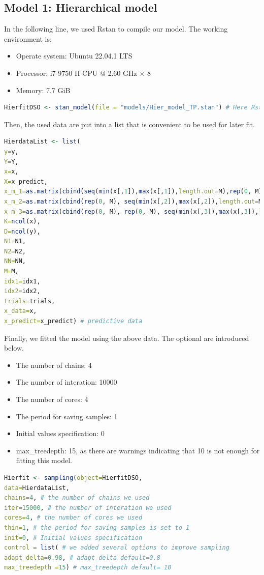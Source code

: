 \documentclass[a4paper]{artikel3}
\begin{document}
\subsection*{Model 1: Hierarchical model}
In the following line, we used Rstan to compile our model. The working environment is: 
\begin{itemize}
\item Operate system: Ubuntu 22.04.1 LTS
\item Processor: i7-9750 H CPU @ 2.60 GHz $\times$ 8
\item Memory: 7.7 GiB
\end{itemize}
\begin{lstlisting}[language=R]
HierfitDSO <- stan_model(file = "models/Hier_model_TP.stan") # Here Rstan used to compile our model
\end{lstlisting}

Then, the used data are put into a list that is convenient to be used for later fit. 

\begin{lstlisting}[language=R]
HierdataList <- list(
y=y,
Y=Y,
x=x, 
X=x_predict,
x_m_1=as.matrix(cbind(seq(min(x[,1]),max(x[,1]),length.out=M),rep(0, M), rep(0, M))),
x_m_2=as.matrix(cbind(rep(0, M), seq(min(x[,2]),max(x[,2]),length.out=M), rep(0, M))),
x_m_3=as.matrix(cbind(rep(0, M), rep(0, M), seq(min(x[,3]),max(x[,3]),length.out=M))),
K=ncol(x), 
D=ncol(y), 
N1=N1,
N2=N2,
NN=NN,
M=M,
idx1=idx1,
idx2=idx2,
trials=trials,
x_data=x,
x_predict=x_predict) # predictive data
\end{lstlisting}

Finally, we fitted the model using the above data. The optional are introduced below. 

\begin{itemize}
\item The number of chains: 4
\item The number of interation: 10000
\item The number of cores: 4
\item The period for saving samples: 1
\item Initial values specification: 0
\item max\_treedepth: 15, as there are warnings indicating that 10 is not enough for fitting this model.  
\end{itemize}

\begin{lstlisting}[language=R]
Hierfit <- sampling(object=HierfitDSO,
data=HierdataList,
chains=4, # the number of chains we used
iter=15000, # the number of interation we used
cores=4, # the number of cores we used
thin=1, # the period for saving samples is set to 1
init=0, # Initial values specification
control = list( # we added several options to improve sampling
adapt_delta=0.98, # adapt_delta default=0.8
max_treedepth =15) # max_treedepth default= 10
\end{lstlisting}
\end{document}
